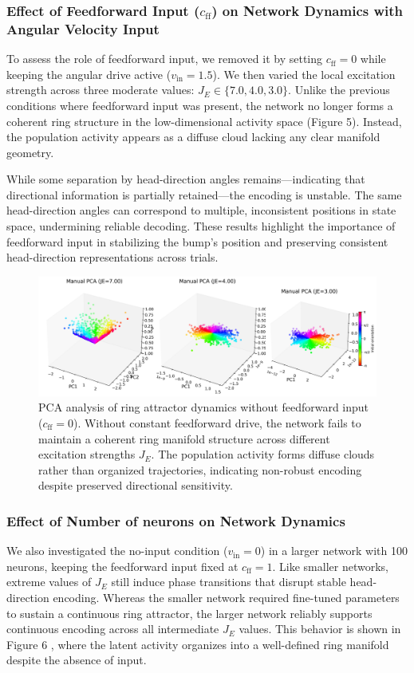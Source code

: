 \documentclass[11pt,a4paper]{article}
\begin{document}
\subsubsection*{Effect of Feedforward Input (\( c_{\text{ff}} \)) on Network Dynamics with Angular Velocity Input}
To assess the role of feedforward input, we removed it by setting \( c_{\text{ff}} = 0 \) while keeping the angular drive active (\( v_{\text{in}} = 1.5 \)). 
We then varied the local excitation strength across three moderate values: \( J_E \in \{7.0, 4.0, 3.0\} \). 
Unlike the previous conditions where feedforward input was present, the network no longer forms a coherent ring structure in the low-dimensional activity space (Figure 5). 
Instead, the population activity appears as a diffuse cloud lacking any clear manifold geometry.

While some separation by head-direction angles remains—indicating that directional information is partially retained—the encoding is unstable. 
The same head-direction angles can correspond to multiple, inconsistent positions in state space, undermining reliable decoding. 
These results highlight the importance of feedforward input in stabilizing the bump’s position and preserving consistent head-direction representations across trials.

\begin{figure}[H]
\centering
\includegraphics[width=1.0\textwidth]{manual_pca_cff_zero.png}
\caption{PCA analysis of ring attractor dynamics without feedforward input (\( c_{\text{ff}} = 0 \)). Without constant feedforward drive, the network fails to maintain a coherent ring manifold structure across different excitation strengths \( J_E \). The population activity forms diffuse clouds rather than organized trajectories, indicating non-robust encoding despite preserved directional sensitivity.}
\label{fig:pca_cff_zero}
\end{figure}


\subsubsection*{Effect of Number of neurons on Network Dynamics}
We also investigated the no-input condition (\( v_{\text{in}} = 0 \)) in a larger network with 100 neurons, keeping the feedforward input fixed at \( c_{\text{ff}} = 1 \). Like smaller networks, extreme values of \( J_E \) still induce phase transitions that disrupt stable head-direction encoding. Whereas the smaller network required fine-tuned parameters to sustain a continuous ring attractor, the larger network reliably supports continuous encoding across all intermediate \( J_E \) values. This behavior is shown in Figure 6 , where the latent activity organizes into a well-defined ring manifold despite the absence of input.
\end{document}
